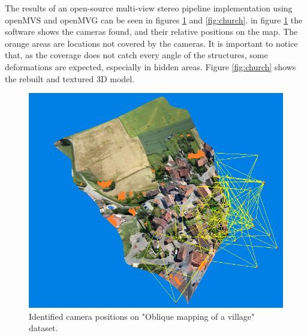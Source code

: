 The results of an open-source multi-view stereo pipeline implementation using openMVS\cite{openmvs} and openMVG\cite{openmvg} can be seen in figures \ref{fig:cameras} and \ref{fig:church}. 
%
in figure \ref{fig:cameras} the software shows the cameras found, and their relative positions on the map. 
%
The orange areas are locations not covered by the cameras. 
%
It is important to notice that, as the coverage does not catch every angle of the structures, some deformations are expected, especially in hidden areas. 
%
Figure \ref{fig:church} shows the rebuilt and textured 3D model.
 
 \begin{figure}
\centering
  \includegraphics[width=\linewidth]{figs/cameras.png}
  \caption{Identified camera positions on "Oblique mapping of a village" dataset\cite{datasets}. }
  \label{fig:cameras}
\end{figure}


